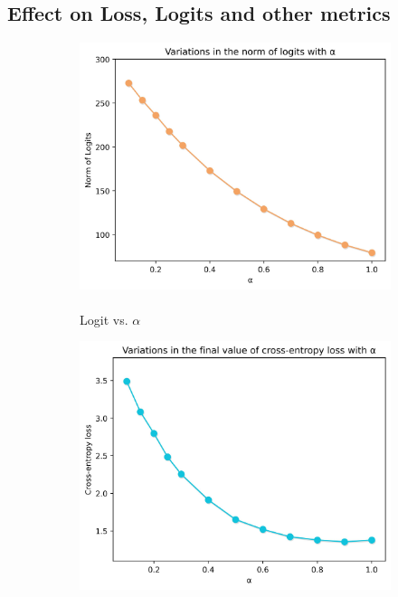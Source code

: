 \documentclass[times,sort&compress]{elsarticle}
\begin{document}
\subsection{Effect on Loss, Logits and other metrics}
\label{sec:Effe}



\begin{figure}[t]
\centering
\begin{subfigure}{.33\columnwidth}
\centering
\includegraphics[width=0.96\columnwidth]{logit_vs_alpha}
\caption{\\Logit vs. $\alpha$}
\end{subfigure}%
\begin{subfigure}{.33\columnwidth}
\centering
\includegraphics[width=0.96\columnwidth]{loss_vs_alpha}

\end{subfigure}
\end{figure}
\end{document}

